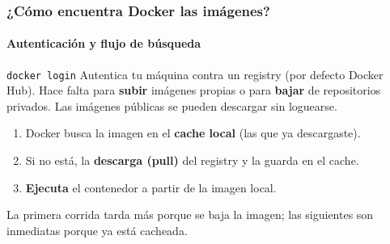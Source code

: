 \begin{frame}
    \frametitle{¿Cómo encuentra Docker las imágenes?}
    \framesubtitle{Autenticación y flujo de búsqueda}

    \begin{block}{\texttt{docker login}}
        Autentica tu máquina contra un registry (por defecto Docker Hub). Hace falta para \textbf{subir} imágenes propias o para \textbf{bajar} de repositorios privados. Las imágenes públicas se pueden descargar sin loguearse.
    \end{block}

    \begin{center}
    \end{center}

    \begin{enumerate}
        \item Docker busca la imagen en el \textbf{cache local} (las que ya descargaste).
        \item Si no está, la \textbf{descarga (pull)} del registry y la guarda en el cache.
        \item \textbf{Ejecuta} el contenedor a partir de la imagen local.
    \end{enumerate}

    \small La primera corrida tarda más porque se baja la imagen; las siguientes son inmediatas porque ya está cacheada.
\end{frame}


